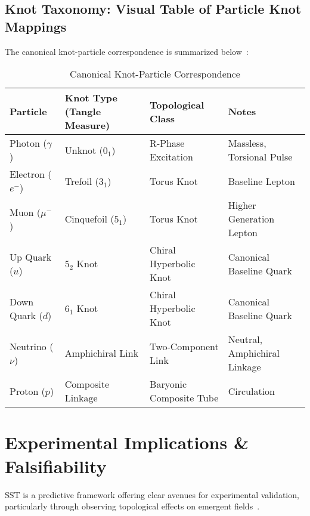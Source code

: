 \documentclass[10pt,reprint,aps,onecolumn,nofootinbib]{revtex4-2}
\begin{document}
\subsection*{Knot Taxonomy: Visual Table of Particle Knot Mappings}

The canonical knot-particle correspondence is summarized below~\cite{1, 4}:

\begin{table}[h!]\centering\small
\begin{adjustbox}{max width=\textwidth}
\begin{tabular}{|l|l|l|l|}
\hline
\textbf{Particle} & \textbf{Knot Type (Tangle Measure)} & \textbf{Topological Class} & \textbf{Notes} \\
\hline
Photon ($\gamma$) & Unknot ($0_1$) & R-Phase Excitation & Massless, Torsional Pulse~\cite{1, 4} \\
Electron ($e^-$) & Trefoil ($3_1$) & Torus Knot & Baseline Lepton~\cite{1, 4} \\
Muon ($\mu^-$) & Cinquefoil ($5_1$) & Torus Knot & Higher Generation Lepton~\cite{4} \\
Up Quark ($u$) & $5_2$ Knot & Chiral Hyperbolic Knot & Canonical Baseline Quark~\cite{1, 4} \\
Down Quark ($d$) & $6_1$ Knot & Chiral Hyperbolic Knot & Canonical Baseline Quark~\cite{1, 4} \\
Neutrino ($\nu$) & Amphichiral Link & Two-Component Link & Neutral, Amphichiral Linkage~\cite{4} \\
Proton ($p$) & Composite Linkage & Baryonic Composite Tube & Circulation~\cite{3} \\
\hline
\end{tabular}
\end{adjustbox}
\caption{Canonical Knot-Particle Correspondence}\label{tab:knotetable}
\end{table}


\section{Experimental Implications \& Falsifiability}
\label{sec:falsifiability}

SST is a predictive framework offering clear avenues for experimental validation, particularly through observing topological effects on emergent fields~\cite{2}.
\end{document}
